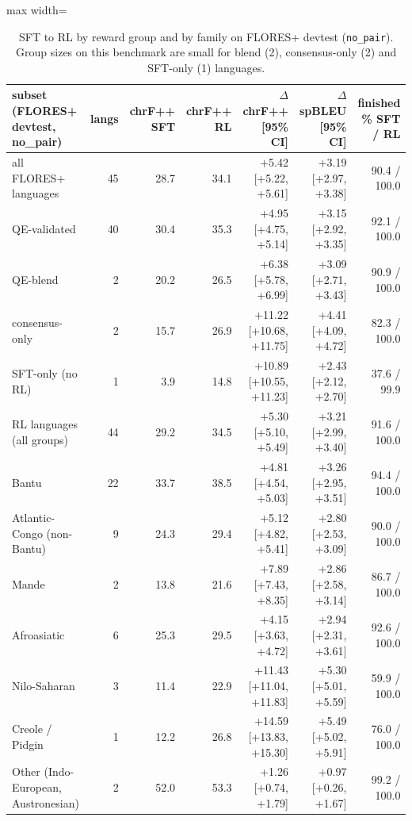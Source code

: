 \begin{table}[t]
\centering
\footnotesize
\setlength{\tabcolsep}{3pt}
\caption{SFT to RL by reward group and by family on FLORES+ devtest (\texttt{no\_pair}). Group sizes on this benchmark are small for blend (2), consensus-only (2) and SFT-only (1) languages.}
\label{tab:t_groups}
\begin{adjustbox}{max width=\linewidth}
{\def\LTcaptype{none} %
\begin{tabular}{@{}lrrrrrr@{}}
\toprule
subset (FLORES+ devtest, no\_pair) & langs & chrF++ SFT & chrF++ RL & \(\Delta\) chrF++ {[}95\% CI{]} & \(\Delta\) spBLEU {[}95\% CI{]} & finished \% SFT / RL \\
\midrule
all FLORES+ languages & 45 & 28.7 & 34.1 & +5.42 {[}+5.22, +5.61{]} & +3.19 {[}+2.97, +3.38{]} & 90.4 / 100.0 \\
QE-validated & 40 & 30.4 & 35.3 & +4.95 {[}+4.75, +5.14{]} & +3.15 {[}+2.92, +3.35{]} & 92.1 / 100.0 \\
QE-blend & 2 & 20.2 & 26.5 & +6.38 {[}+5.78, +6.99{]} & +3.09 {[}+2.71, +3.43{]} & 90.9 / 100.0 \\
consensus-only & 2 & 15.7 & 26.9 & +11.22 {[}+10.68, +11.75{]} & +4.41 {[}+4.09, +4.72{]} & 82.3 / 100.0 \\
SFT-only (no RL) & 1 & 3.9 & 14.8 & +10.89 {[}+10.55, +11.23{]} & +2.43 {[}+2.12, +2.70{]} & 37.6 / 99.9 \\
RL languages (all groups) & 44 & 29.2 & 34.5 & +5.30 {[}+5.10, +5.49{]} & +3.21 {[}+2.99, +3.40{]} & 91.6 / 100.0 \\
Bantu & 22 & 33.7 & 38.5 & +4.81 {[}+4.54, +5.03{]} & +3.26 {[}+2.95, +3.51{]} & 94.4 / 100.0 \\
Atlantic-Congo (non-Bantu) & 9 & 24.3 & 29.4 & +5.12 {[}+4.82, +5.41{]} & +2.80 {[}+2.53, +3.09{]} & 90.0 / 100.0 \\
Mande & 2 & 13.8 & 21.6 & +7.89 {[}+7.43, +8.35{]} & +2.86 {[}+2.58, +3.14{]} & 86.7 / 100.0 \\
Afroasiatic & 6 & 25.3 & 29.5 & +4.15 {[}+3.63, +4.72{]} & +2.94 {[}+2.31, +3.61{]} & 92.6 / 100.0 \\
Nilo-Saharan & 3 & 11.4 & 22.9 & +11.43 {[}+11.04, +11.83{]} & +5.30 {[}+5.01, +5.59{]} & 59.9 / 100.0 \\
Creole / Pidgin & 1 & 12.2 & 26.8 & +14.59 {[}+13.83, +15.30{]} & +5.49 {[}+5.02, +5.91{]} & 76.0 / 100.0 \\
Other (Indo-European, Austronesian) & 2 & 52.0 & 53.3 & +1.26 {[}+0.74, +1.79{]} & +0.97 {[}+0.26, +1.67{]} & 99.2 / 100.0 \\
\bottomrule
\end{tabular}
}
\end{adjustbox}
\end{table}


